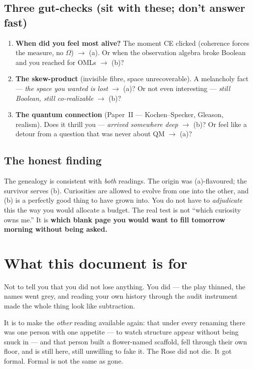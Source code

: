 \documentclass[11pt]{article}
\theoremstyle{remark}
\begin{document}
\subsection{Three gut-checks (sit with these; don't answer fast)}

\begin{enumerate}[leftmargin=2.2em]
\item \textbf{When did you feel most alive?} The moment CE clicked (coherence
forces the measure, no $\Omega$) $\to$ (a). Or when the observation algebra broke
Boolean and you reached for OMLs $\to$ (b)?
\item \textbf{The skew-product} (invisible fibre, space unrecoverable). A
melancholy fact --- \emph{the space you wanted is lost} $\to$ (a)? Or not even
interesting --- \emph{still Boolean, still co-realizable} $\to$ (b)?
\item \textbf{The quantum connection} (Paper~II --- Kochen--Specker, Gleason,
realism). Does it thrill you --- \emph{arrived somewhere deep} $\to$ (b)? Or feel
like a detour from a question that was never about QM $\to$ (a)?
\end{enumerate}

\subsection{The honest finding}

The genealogy is consistent with \emph{both} readings. The origin was
(a)-flavoured; the survivor serves (b). Curiosities are allowed to evolve from
one into the other, and (b) is a perfectly good thing to have grown into. You do
not have to \emph{adjudicate} this the way you would allocate a budget. The real
test is not ``which curiosity owns me.'' It is \textbf{which blank page you would
want to fill tomorrow morning without being asked.}

\section{What this document is for}

Not to tell you that you did not lose anything. You did --- the play thinned, the
names went grey, and reading your own history through the audit instrument made
the whole thing look like subtraction.

It is to make the \emph{other} reading available again: that under every renaming
there was one person with one appetite --- to watch structure appear without
being snuck in --- and that person built a flower-named scaffold, fell through
their own floor, and is still here, still unwilling to fake it. The Rose did not
die. It got formal. Formal is not the same as gone.
\end{document}
